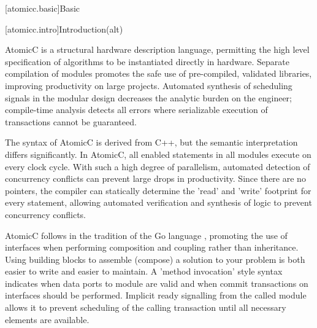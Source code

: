 [atomicc.basic]{Basic}

[atomicc.intro]{Introduction(alt)}

AtomicC is a structural hardware description language, permitting
the high level specification of algorithms to be instantiated
directly in hardware.
Separate compilation of modules promotes the safe use of pre-compiled, validated
libraries, improving productivity on large projects.
Automated synthesis of scheduling signals in the modular design
decreases the analytic burden on the engineer; compile-time analysis
detects all errors where serializable execution of transactions cannot be guaranteed.


The syntax of AtomicC is derived from C++, but
the semantic interpretation differs significantly.
In AtomicC, all enabled statements in all modules execute on every clock cycle.
With such a high degree of parallelism, automated detection of concurrency
conflicts can prevent large drops in productivity.
Since there are no pointers, the compiler can statically determine the 'read' and 'write'
footprint for every statement, allowing automated verification and
synthesis of logic to prevent concurrency conflicts.

AtomicC follows in the tradition of the Go language \cite{Pike2012},
promoting the use of interfaces when performing composition and
coupling rather than inheritance.  Using building blocks to assemble (compose) a solution
to your problem is both easier to write and easier to maintain.
A 'method invocation' style syntax indicates when data ports to module
are valid and when commit transactions on interfaces should be performed.
Implicit ready signalling from the called module allows it to prevent
scheduling of the calling transaction until all necessary elements are
available.

